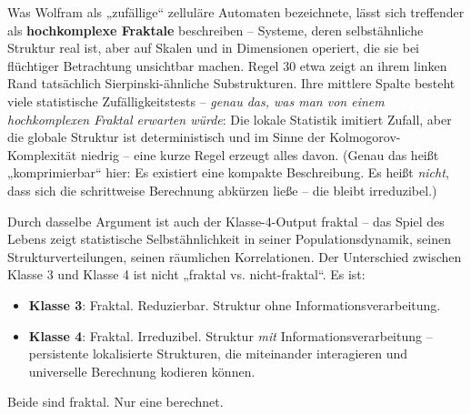 \documentclass[11pt, twoside, openright]{book}
\begin{document}
Was Wolfram als „zufällige“ zelluläre Automaten bezeichnete, lässt sich treffender als \textbf{hochkomplexe Fraktale} beschreiben -- Systeme, deren selbstähnliche Struktur real ist, aber auf Skalen und in Dimensionen operiert, die sie bei flüchtiger Betrachtung unsichtbar machen. Regel 30 etwa zeigt an ihrem linken Rand tatsächlich Sierpinski-ähnliche Substrukturen. Ihre mittlere Spalte besteht viele statistische Zufälligkeitstests -- \textit{genau das, was man von einem hochkomplexen Fraktal erwarten würde}: Die lokale Statistik imitiert Zufall, aber die globale Struktur ist deterministisch und im Sinne der Kolmogorov-Komplexität niedrig -- eine kurze Regel erzeugt alles davon. (Genau das heißt „komprimierbar“ hier: Es existiert eine kompakte Beschreibung. Es heißt \textit{nicht}, dass sich die schrittweise Berechnung abkürzen ließe -- die bleibt irreduzibel.)

Durch dasselbe Argument ist auch der Klasse-4-Output fraktal -- das Spiel des Lebens zeigt statistische Selbstähnlichkeit in seiner Populationsdynamik, seinen Strukturverteilungen, seinen räumlichen Korrelationen. Der Unterschied zwischen Klasse 3 und Klasse 4 ist nicht „fraktal vs. nicht-fraktal“. Es ist:

\begin{itemize}
  \item \textbf{Klasse 3}: Fraktal. Reduzierbar. Struktur ohne Informationsverarbeitung.
  \item \textbf{Klasse 4}: Fraktal. Irreduzibel. Struktur \textit{mit} Informationsverarbeitung -- persistente lokalisierte Strukturen, die miteinander interagieren und universelle Berechnung kodieren können.
\end{itemize}

Beide sind fraktal. Nur eine berechnet.


\clearpage
\thispagestyle{plain}
\vspace*{\fill}
\begin{center}
\end{center}
\vspace*{\fill}
\clearpage
\end{document}
